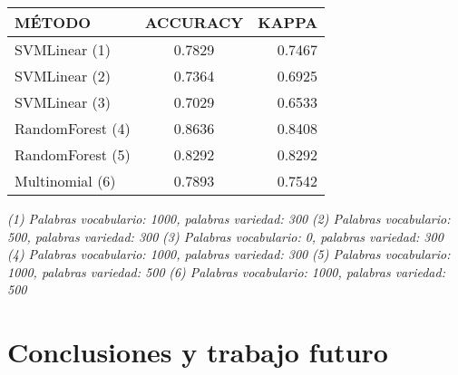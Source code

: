 \documentclass[11pt,a4paper]{article}
\begin{document}
\begin{table}[htbp]
\begin{center}
\begin{tabular}[t]{|l |c |r|}
\hline
M\'ETODO & ACCURACY & KAPPA \\
\hline \hline
SVMLinear (1) & 0.7829 & 0.7467 \\ \hline
SVMLinear (2) & 0.7364 & 0.6925 \\ \hline
SVMLinear (3) & 0.7029 & 0.6533 \\ \hline
RandomForest (4) & 0.8636 & 0.8408 \\ \hline
RandomForest (5) & 0.8292 & 0.8292 \\ \hline
Multinomial (6) & 0.7893 & 0.7542 \\ \hline

\end{tabular}
\label{tabla:sencilla}
\end{center}
\end{table}

\textit {(1) Palabras vocabulario: 1000, palabras variedad: 300}\newline
\textit {(2) Palabras vocabulario: 500, palabras variedad: 300}\newline
\textit {(3) Palabras vocabulario: 0, palabras variedad: 300}\newline
\textit {(4) Palabras vocabulario: 1000, palabras variedad: 300}\newline
\textit {(5) Palabras vocabulario: 1000, palabras variedad: 500}\newline
\textit {(6) Palabras vocabulario: 1000, palabras variedad: 500}\newline




\section{Conclusiones y trabajo futuro}
\end{document}
